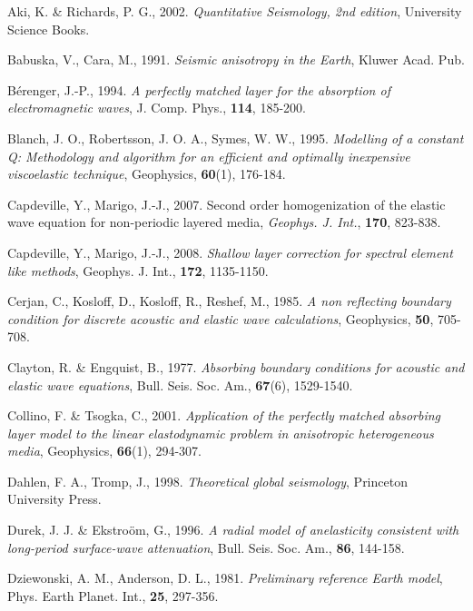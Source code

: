 \begin{thebibliography}{99}

 Aki, K. \& Richards, P. G., 2002. \emph{Quantitative
Seismology, 2nd edition}, University Science Books.

 Babuska, V., Cara, M., 1991. \emph{Seismic anisotropy in the Earth}, Kluwer Acad. Pub.

 B\'{e}renger, J.-P., 1994. \emph{A perfectly matched layer
for the absorption of electromagnetic waves}, J. Comp. Phys.,
\textbf{114}, 185-200.

 Blanch, J. O., Robertsson, J. O. A., Symes, W. W., 1995. \emph{Modelling of a constant Q: Methodology and algorithm for an efficient and optimally inexpensive viscoelastic technique}, Geophysics, \textbf{60}(1), 176-184.

 Capdeville, Y., Marigo, J.-J., 2007.
Second order homogenization of the elastic wave equation for
non-periodic layered media, \emph{Geophys. J. Int.}, \textbf{170},
823-838.

 Capdeville, Y., Marigo, J.-J., 2008.
\emph{Shallow layer correction for spectral element like methods},
Geophys. J. Int., \textbf{172}, 1135-1150.

 Cerjan, C., Kosloff, D., Kosloff, R., Reshef,
M., 1985. \emph{A non reflecting boundary condition for discrete
acoustic and elastic wave calculations}, Geophysics, \textbf{50},
705-708.

 Clayton, R. \& Engquist, B., 1977.
\emph{Absorbing boundary conditions for acoustic and elastic wave
equations}, Bull. Seis. Soc. Am., \textbf{67}(6), 1529-1540.

 Collino, F. \& Tsogka, C., 2001. \emph{Application
of the perfectly matched absorbing layer model to the linear
elastodynamic problem in anisotropic heterogeneous media},
Geophysics, \textbf{66}(1), 294-307.

 Dahlen, F. A., Tromp, J., 1998.
\emph{Theoretical global seismology}, Princeton University Press.

 Durek, J. J. \& Ekstro\"{o}m, G., 1996. \emph{A radial model of anelasticity consistent with long-period surface-wave attenuation}, Bull. Seis. Soc. Am., \textbf{86}, 144-158.

 Dziewonski, A. M., Anderson, D. L., 1981.
\emph{Preliminary reference Earth model}, Phys. Earth Planet. Int.,
\textbf{25}, 297-356.


\end{thebibliography}
